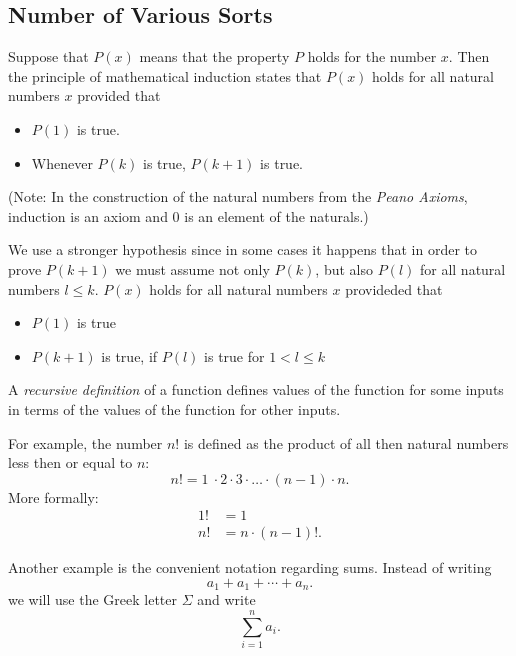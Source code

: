 \pagebreak
\subsection{Number of Various Sorts}
\begin{defi} Suppose that $P(x)$ means that the property
$P$ holds for the number $x$. Then the principle of mathematical induction
states that $P(x)$ holds for all natural numbers $x$ provided that
\begin{itemize}
    \item $P(1)$ is true.
    \item Whenever $P(k)$ is true, $P(k+1)$ is true.
\end{itemize}     
\end{defi}

(Note: In the construction of the natural numbers from the \emph{Peano Axioms},
induction is an axiom and $0$ is an element of the naturals.)

\begin{defi} We use a stronger hypothesis since in some cases
it happens that in order to prove $P(k+1)$ we must assume not only $P(k)$, but
also $P(l)$ for all natural numbers $l \leq k$. $P(x)$ holds for all natural
numbers $x$ provideded that
\begin{itemize}
    \item $P(1)$ is true
    \item $P(k+1)$ is true, if $P(l)$ is true for $1<l \leq k$
\end{itemize}
\end{defi}

\begin{defi} A \emph{recursive definition} of a function
defines values of the function for some inputs in terms of the values of the
function for other inputs.
\end{defi}

For example, the number $n!$ is defined as the product of all then natural
numbers less then or equal to $n$:
\begin{equation*}
    n! = 1\ \cdot 2 \cdot 3 \cdot \dotsc \cdot (n-1) \cdot n.
\end{equation*} 
More formally:
\begin{align}
    1! &= 1 \\
    n!&=n\cdot (n-1)!.
\end{align}

Another example is the convenient notation regarding sums. Instead of writing 
\begin{equation*}
    a_1 + a_1 + \dotsb + a_n.
\end{equation*}
we will use the Greek letter $\Sigma$ and write
\begin{equation*}
    \sum \limits_{i=1}^{n} a_i. 
\end{equation*}

